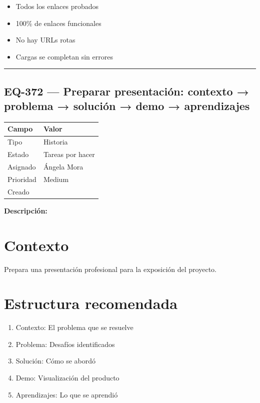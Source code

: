\documentclass[
  spanish,
  11pt,
]{report}
\newcounter{none} %
\providecommand{\tightlist}{%
  \setlength{\itemsep}{0pt}\setlength{\parskip}{0pt}}
\begin{document}
\begin{itemize}
\tightlist
\item[$\square$]
  Todos los enlaces probados
\item[$\square$]
  100\% de enlaces funcionales
\item[$\square$]
  No hay URLs rotas
\item[$\square$]
  Cargas se completan sin errores
\end{itemize}

\begin{center}\rule{0.5\linewidth}{0.5pt}\end{center}

\subsection{EQ-372 --- Preparar presentación: contexto → problema →
solución → demo →
aprendizajes}\label{eq-372-preparar-presentaciuxf3n-contexto-problema-soluciuxf3n-demo-aprendizajes}

{\def\LTcaptype{none} %
\begin{longtable}[]{@{}ll@{}}
\toprule\noalign{}
Campo & Valor \\
\midrule\noalign{}
\endhead
\bottomrule\noalign{}
\endlastfoot
Tipo & Historia \\
Estado & Tareas por hacer \\
Asignado & Ángela Mora \\
Prioridad & Medium \\
Creado & \\
\end{longtable}
}

\textbf{Descripción:}

\section{Contexto}\label{contexto-10}

Prepara una presentación profesional para la exposición del proyecto.

\section{Estructura recomendada}\label{estructura-recomendada}

\begin{enumerate}
\def\labelenumi{\arabic{enumi}.}
\tightlist
\item
  Contexto: El problema que se resuelve
\item
  Problema: Desafíos identificados
\item
  Solución: Cómo se abordó
\item
  Demo: Visualización del producto
\item
  Aprendizajes: Lo que se aprendió
\end{enumerate}
\end{document}
